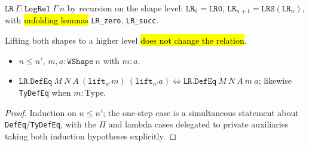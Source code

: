 \begin{definition}
\label{def:expa-lr}
\leanok
{}
 $\mathtt{LR}\ \Gamma:\mathtt{LogRel}\ \Gamma\ n$ by recursion on the shape level:
$\mathtt{LR}_0=\mathtt{LR0}$, $\mathtt{LR}_{n+1}=\mathtt{LRS}(\mathtt{LR}_n)$, with \hl{unfolding
lemmas} \texttt{LR\_zero}, \texttt{LR\_succ}.
\end{definition}

\begin{theorem}
\label{thm:expa-lr-lift}
\leanok
{}
 Lifting both shapes to a higher level \hl{does not change the relation}.
\begin{itemize}
\item {} $n\le n'$, $m,a:\mathtt{WShape}\ n$ with $m:a$.
\item {} $\mathtt{LR.DefEq}\ M\ N\ A\ (\mathtt{lift}_{n'}m)\ (\mathtt{lift}_{n'}a)\iff
\mathtt{LR.DefEq}\ M\ N\ A\ m\ a$; likewise \texttt{TyDefEq} when $m:\mathrm{Type}$.
\end{itemize}
\end{theorem}
\begin{proof}
\leanok
{} Induction on $n\le n'$; the one-step case is a simultaneous statement about
\texttt{DefEq}/\texttt{TyDefEq}, with the $\Pi$ and lambda cases delegated to private auxiliaries
taking both induction hypotheses explicitly.
\end{proof}

